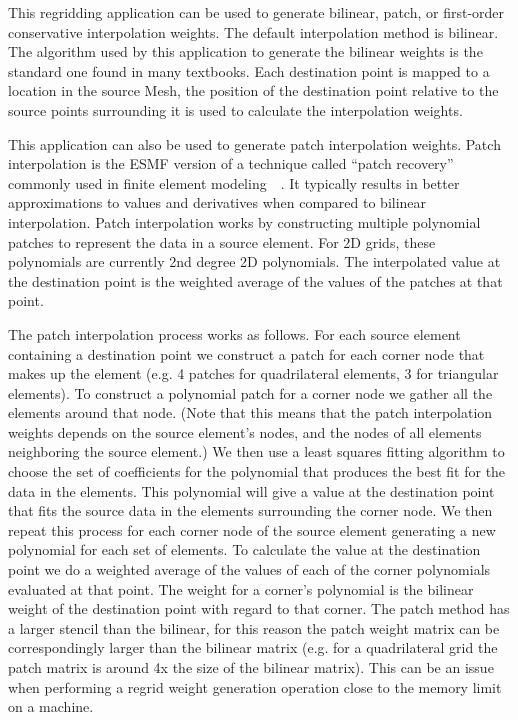  This regridding application can be used to generate bilinear, patch, or first-order conservative interpolation weights. The default interpolation method
is bilinear. The algorithm used by this application to generate the bilinear weights is the standard one found in
many textbooks.  Each destination point is mapped to a location in the source Mesh, the position of the destination point relative 
to the source points surrounding it is used to calculate the interpolation weights. 

 This application can also be used to generate patch interpolation weights. Patch
interpolation is the ESMF version of a technique called ``patch recovery'' commonly
used in finite element modeling~\cite{PatchInterp1}~\cite{PatchInterp2}. It typically results in better approximations to values and derivatives when compared to bilinear interpolation.  
Patch interpolation works by constructing multiple polynomial patches to represent
the data in a source element. For 2D grids, these polynomials 
are currently 2nd degree 2D polynomials. The interpolated value at the destination point 
is the weighted average of the values of the patches at that point. 

The patch interpolation process works as follows. 
For each source element containing a destination point
we construct a patch for each corner node that makes up the element (e.g. 4 patches for 
quadrilateral elements, 3 for triangular elements). To construct a polynomial patch for
 a corner node we gather all the elements around that node. 
(Note that this means that the patch interpolation weights depends on the source 
element's nodes, and the nodes of all elements neighboring the source element.)  
We then use a least squares fitting algorithm to choose the set of coefficients 
for the polynomial that produces the best fit for the data in the elements. 
This polynomial will give a value at the destination point that fits the source data 
in the elements surrounding the corner node. We then repeat this process for each 
corner node of the source element generating a new polynomial for each set of elements.  
To calculate the value at the destination point we do a weighted average of the values 
of each of the corner polynomials evaluated at that point. The weight for a corner's 
polynomial is the bilinear weight of the destination point with regard to that corner.  
The patch method has a larger stencil than the bilinear, for this reason the patch weight matrix can be correspondingly larger
than the bilinear matrix (e.g. for a quadrilateral grid the patch matrix is around 4x the size of
the bilinear matrix). This can be an issue when performing a regrid weight generation operation close to the memory
limit on a machine. 


